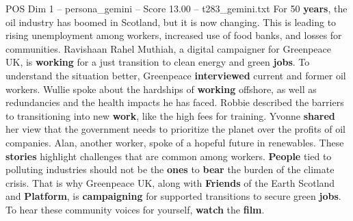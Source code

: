 \begin{textsample}{POS Dim 1 – persona\_gemini – Score 13.00 – t283\_gemini.txt}  \label{ex:f1_pos_044}
For 50 \textbf{years}, the oil industry has boomed in Scotland, but it is now changing.
This is leading to rising unemployment among workers, increased use of food banks, and losses for communities.
Ravishaan Rahel Muthiah, a digital campaigner for Greenpeace UK, is \textbf{working} for a just transition to clean energy and green \textbf{jobs}.
To understand the situation better, Greenpeace \textbf{interviewed} current and former oil workers.
Wullie spoke about the hardships of \textbf{working} offshore, as well as redundancies and the health impacts he has faced.
Robbie described the barriers to transitioning into new \textbf{work}, like the high fees for training.
Yvonne \textbf{shared} her view that the government needs to prioritize the planet over the profits of oil companies.
Alan, another worker, spoke of a hopeful future in renewables.
These \textbf{stories} highlight challenges that are common among workers. \textbf{People} tied to polluting industries should not be the \textbf{ones} to \textbf{bear} the burden of the climate crisis.
That is why Greenpeace UK, along with \textbf{Friends} of the Earth Scotland and \textbf{Platform}, is \textbf{campaigning} for supported transitions to secure green \textbf{jobs}.
To hear these community voices for yourself, \textbf{watch} the \textbf{film}.

\end{textsample}
